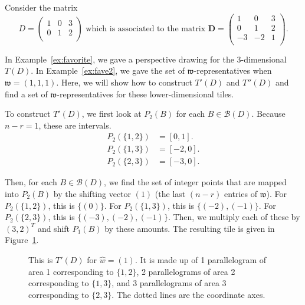 \documentclass[ALCO,ThmDefs,Unicode,epreuves]{cedram}
\newcommand{\D}{\mathbf{D}}
\newcommand{\B}{\mathcal{B}}
\newcommand{\w}{\mathfrak w}
\begin{document}
\begin{exam} \label{ex:fave3}
Consider the matrix 
\[
D = \begin{pmatrix}
1 & 0 & 3 \\
0 & 1 & 2\\
\end{pmatrix}
\text{ which is associated to the matrix }
\D = \begin{pmatrix}
1 & 0 & 3 \\
0 & 1 & 2\\
-3&-2 & 1\\
\end{pmatrix}.
\]

In Example~\ref{ex:favorite}, we gave a perspective drawing for the 3-dimensional $T(D)$. In Example~\ref{ex:fave2}, we gave the set of $\w$-representatives when $\w = (1,1,1)$. Here, we will show how to construct $T'(D)$ and $T''(D)$ and find a set of $\w$-representatives for these lower-dimensional tiles. 

To construct $T'(D)$, we first look at $P_2(B)$ for each $B \in \B(D)$. Because $n-r=1$, these are intervals.
\begin{align*}
P_2(\{1,2\}) & = [0,1].\\ 
P_2(\{1,3\}) & = [-2,0].\\ 
P_2(\{2,3\}) & = [-3,0]. 
\end{align*}

Then, for each $B \in \B(D)$, we find the set of integer points that are mapped into $P_2(B)$ by the shifting vector $(1)$ (the last $(n-r)$ entries of $\w$). For $P_2(\{1,2\})$, this is $\{(0)\}$. For $P_2(\{1,3\})$, this is $\{(-2),(-1)\}$. For $P_2(\{2,3\})$, this is $\{(-3),(-2),(-1)\}$. Then, we multiply each of these by $(3,2)^T$ and shift $P_1(B)$ by these amounts. The resulting tile is given in Figure~\ref{fig:T'D}.

\begin{figure}[htb]\centering
{}
\caption{This is $T'(D)$ for ${\widehat w} = (1)$. It is made up of 1 parallelogram of area 1 corresponding to $\{1,2\}$, 2 parallelograms of area 2 corresponding to $\{1,3\}$, and 3 parallelograms of area 3 corresponding to 
$\{2,3\}$. The dotted lines are the coordinate axes.}
\label{fig:T'D}
\end{figure}


\end{exam}
\end{document}
